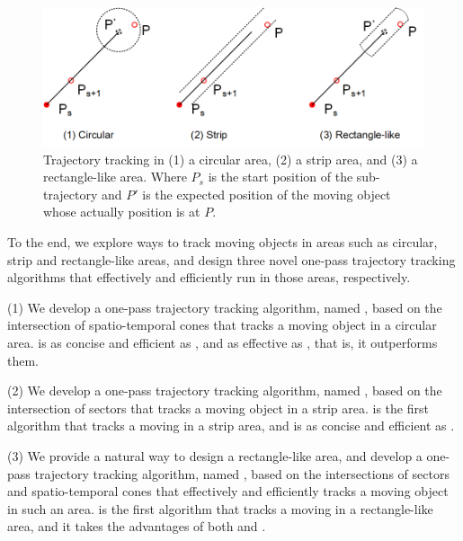 \begin{figure}[tb!]
	\centering
	\includegraphics[scale=1.0]{Figures/Fig-Areas.png}\vspace{-1ex}
	\caption{\small  Trajectory tracking in (1) a circular area, (2) a strip area, and (3) a rectangle-like area. Where $P_s$ is the start position of the sub-trajectory and $P'$ is the expected position of the moving object whose actually position is at $P$.}
	\vspace{-2ex}
	\label{fig:areas}
\end{figure}

To the end, we explore ways to track moving objects in areas such as circular, strip and rectangle-like areas, and design three novel one-pass trajectory tracking algorithms that effectively and efficiently run in those areas, respectively. 

\ni (1) We develop a one-pass trajectory tracking algorithm, named \citt, based on the intersection of spatio-temporal cones that tracks a moving object in a circular area. \citt is as concise and efficient as \ldrh, and as effective as \grts, that is, it outperforms them.

\ni (2) We develop a one-pass trajectory tracking algorithm, named \sitt, based on the intersection of sectors that tracks a moving object in a strip area. \sitt is the first algorithm that tracks a moving in a strip area, and is as concise and efficient as \citt. %

\ni (3) We provide a natural way to design a rectangle-like area, and develop a one-pass trajectory tracking algorithm, named \bitt, based on the intersections of sectors and spatio-temporal cones that  effectively and efficiently tracks a moving object in such an area. \bitt is the first algorithm that tracks a moving in a rectangle-like area, and it takes the advantages of both \citt and \sitt. 

